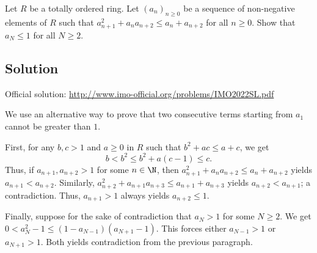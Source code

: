 Let $R$ be a totally ordered ring.
Let $(a_n)_{n \geq 0}$ be a sequence of non-negative elements of $R$ such that $a_{n + 1}^2 + a_n a_{n + 2} \leq a_n + a_{n + 2}$ for all $n \geq 0$.
Show that $a_N \leq 1$ for all $N \geq 2$.



\subsection*{Solution}

Official solution: \url{http://www.imo-official.org/problems/IMO2022SL.pdf}

We use an alternative way to prove that two consecutive terms starting from $a_1$ cannot be greater than $1$.

First, for any $b, c > 1$ and $a \geq 0$ in $R$ such that $b^2 + ac \leq a + c$, we get
\[ b < b^2 \leq b^2 + a(c - 1) \leq c. \]
Thus, if $a_{n + 1}, a_{n + 2} > 1$ for some $n \in \N$, then $a_{n + 1}^2 + a_n a_{n + 2} \leq a_n + a_{n + 2}$ yields $a_{n + 1} < a_{n + 2}$.
Similarly, $a_{n + 2}^2 + a_{n + 1} a_{n + 3} \leq a_{n + 1} + a_{n + 3}$ yields $a_{n + 2} < a_{n + 1}$; a contradiction.
Thus, $a_{n + 1} > 1$ always yields $a_{n + 2} \leq 1$.

Finally, suppose for the sake of contradiction that $a_N > 1$ for some $N \geq 2$.
We get $0 < a_N^2 - 1 \leq (1 - a_{N - 1})(a_{N + 1} - 1)$.
This forces either $a_{N - 1} > 1$ or $a_{N + 1} > 1$.
Both yields contradiction from the previous paragraph.
